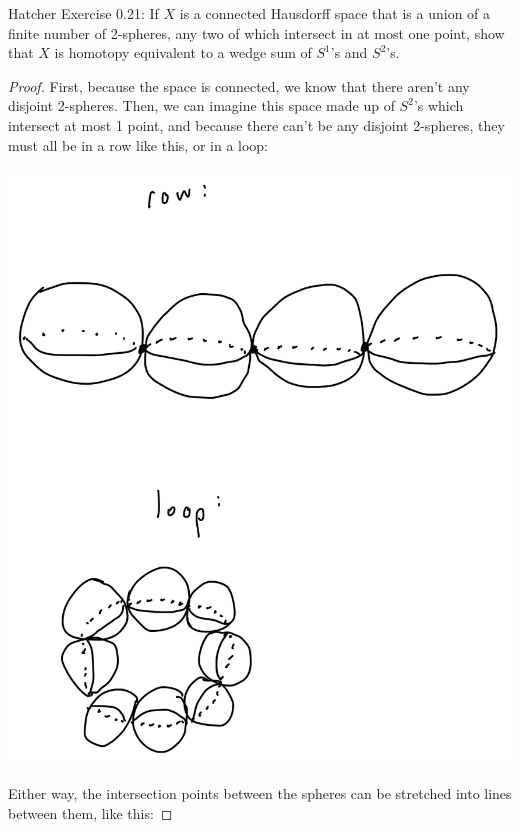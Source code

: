 \documentclass[12pt]{article}
\newenvironment{statement}[2][Statement]{\begin{trivlist}
\item[\hskip \labelsep {\bfseries #1}\hskip \labelsep {\bfseries #2.}]}{\end{trivlist}}
\begin{document}
\begin{statement}[Exercise]{3}
    Hatcher Exercise 0.21: If $X$ is a connected Hausdorff space that is a union of a finite number of 2-spheres, any two of which intersect in at most one point, show that $X$ is homotopy equivalent to a wedge sum of $S^1$'s and $S^2$'s.
\end{statement}
\begin{proof}
    First, because the space is connected, we know that there aren't any disjoint 2-spheres. Then, we can imagine this space made up of $S^2$'s which intersect at most 1 point, and because there can't be any disjoint 2-spheres, they must all be in a row like this, or in a loop:
    \par \includegraphics[scale=.2]{3-1.png}
    \par Either way, the intersection points between the spheres can be stretched into lines between them, like this:

\end{proof}
\end{document}
